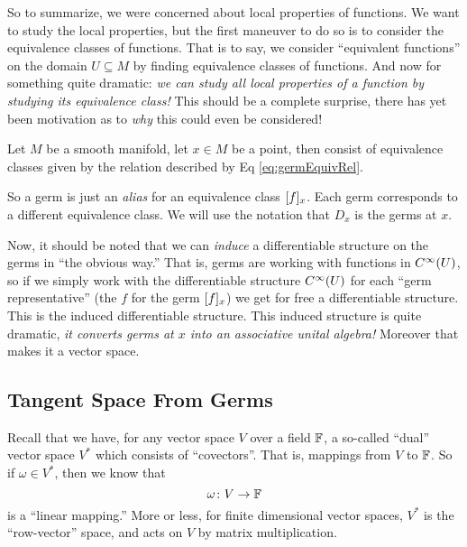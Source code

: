 So to summarize, we were concerned about local properties of
functions. We want to study the local properties, but the first
maneuver to do so is to consider the equivalence classes of
functions. That is to say, we consider ``equivalent functions''
on the domain $U\subseteq M$ by finding equivalence classes of
functions. And now for something quite dramatic: \emph{we can study all
local properties of a function by studying its equivalence class!}
This should be a complete surprise, there has yet been motivation
as to \emph{why} this could even be considered!

\begin{defn}
Let $M$ be a smooth manifold, let $x\in M$ be a point, then
 consist of equivalence
classes given by the relation described by Eq \eqref{eq:germEquivRel}.
\end{defn}

So a germ is just an \emph{alias} for an equivalence class
$\eqclass{f}{x}$. Each germ corresponds to a different
equivalence class.
We will use the notation that $D_{x}$ is the germs at $x$.

Now, it should be noted that we can \emph{induce} a
differentiable structure on the germs in ``the obvious way.''
That is, germs are working with functions in $\diff(U)$, so if we
simply work with the differentiable structure $\diff(U)$ for
each ``germ representative'' (the $f$ for the germ
$\eqclass{f}{x}$) we get for free a differentiable
structure. This is the induced differentiable structure. This
induced structure is quite dramatic, \emph{it converts germs at
  $x$ into an associative unital algebra!} Moreover that makes it
a vector space.

\subsection{Tangent Space From Germs}

Recall that we have, for any vector space $V$ over a field
$\Bbb{F}$, a so-called ``dual'' vector space $V^{*}$ which
consists of ``covectors''. That is, mappings from $V$ to
$\Bbb{F}$. So if $\omega\in V^{*}$, then we know that
\begin{equation}
\omega\colon V\to\Bbb{F}
\end{equation}
is a ``linear mapping.'' More or less, for finite dimensional
vector spaces, $V^{*}$ is the ``row-vector'' space, and acts on
$V$ by matrix multiplication.

